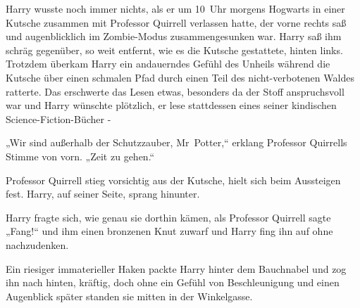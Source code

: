 Harry wusste noch immer nichts, als er um 10~Uhr morgens Hogwarts in einer Kutsche zusammen mit Professor Quirrell verlassen hatte, der vorne rechts saß und augenblicklich im Zombie-Modus zusammengesunken war. Harry saß ihm schräg gegenüber, so weit entfernt, wie es die Kutsche gestattete, hinten links. Trotzdem überkam Harry ein andauerndes Gefühl des Unheils während die Kutsche über einen schmalen Pfad durch einen Teil des nicht-verbotenen Waldes ratterte. Das erschwerte das Lesen etwas, besonders da der Stoff anspruchsvoll war und Harry wünschte plötzlich, er lese stattdessen eines seiner kindischen Science-Fiction-Bücher -

„Wir sind außerhalb der Schutzzauber, Mr~Potter,“ erklang Professor Quirrells Stimme von vorn. „Zeit zu gehen.“

Professor Quirrell stieg vorsichtig aus der Kutsche, hielt sich beim Aussteigen fest. Harry, auf seiner Seite, sprang hinunter.

Harry fragte sich, wie genau sie dorthin kämen, als Professor Quirrell sagte „Fang!“ und ihm einen bronzenen Knut zuwarf und Harry fing ihn auf ohne nachzudenken.

Ein riesiger immaterieller Haken packte Harry hinter dem Bauchnabel und zog ihn nach hinten, kräftig, doch ohne ein Gefühl von Beschleunigung und einen Augenblick später standen sie mitten in der Winkelgasse.

